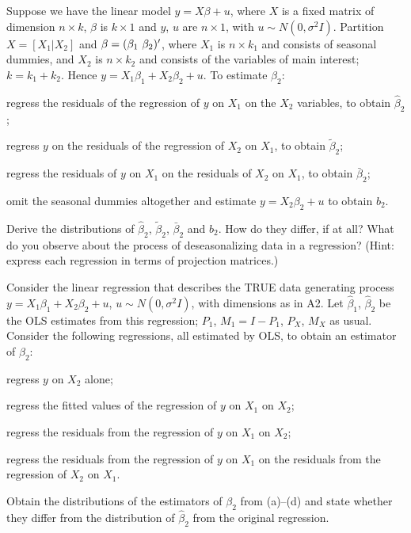 \documentclass[11pt]{article}
\begin{document}
Suppose we have the linear model $y = X\beta + u$, where $X$ is a fixed matrix of
dimension $n \times k$, $\beta$ is $k \times 1$ and $y$, $u$ are $n \times 1$,
with $u \sim N(0,\sigma^{2}I)$. Partition $X = [X_{1}|X_{2}]$ and
$\beta = (\beta_{1}\ \beta_{2})\xT$, where $X_{1}$ is $n \times k_{1}$ and
consists of seasonal dummies, and $X_{2}$ is $n \times k_{2}$ and consists of
the variables of main interest; $k = k_{1} + k_{2}$. Hence
$y = X_{1}\beta_{1} + X_{2}\beta_{2} + u$. To estimate $\beta_{2}$:
\begin{flatlist}
  \item[(i)] regress the residuals of the regression of $y$ on $X_{1}$ on the
        $X_{2}$ variables, to obtain $\hat\beta_{2}$;
  \item[(ii)] regress $y$ on the residuals of the regression of $X_{2}$ on
        $X_{1}$, to obtain $\tilde\beta_{2}$;
  \item[(iii)] regress the residuals of $y$ on $X_{1}$ on the residuals of $X_{2}$
        on $X_{1}$, to obtain $\bar\beta_{2}$;
  \item[(iv)] omit the seasonal dummies altogether and estimate
        $y = X_{2}\beta_{2} + u$ to obtain $b_{2}$.
\end{flatlist}
Derive the distributions of $\hat\beta_{2}$, $\tilde\beta_{2}$, $\bar\beta_{2}$
and $b_{2}$. How do they differ, if at all? What do you observe about the
process of deseasonalizing data in a regression? (Hint: express each regression
in terms of projection matrices.)

Consider the linear regression that describes the TRUE data generating process
$y = X_{1}\beta_{1} + X_{2}\beta_{2} + u$, $u \sim N(0,\sigma^{2}I)$, with
dimensions as in A2. Let $\hat\beta_{1}$, $\hat\beta_{2}$ be the OLS estimates
from this regression; $P_{1}$, $M_{1} = I - P_{1}$, $P_{X}$, $M_{X}$ as usual.
Consider the following regressions, all estimated by OLS, to obtain an estimator
of $\beta_{2}$:
\begin{flatlist}
  \item[(a)] regress $y$ on $X_{2}$ alone;
  \item[(b)] regress the fitted values of the regression of $y$ on $X_{1}$ on $X_{2}$;
  \item[(c)] regress the residuals from the regression of $y$ on $X_{1}$ on $X_{2}$;
  \item[(d)] regress the residuals from the regression of $y$ on $X_{1}$ on the
        residuals from the regression of $X_{2}$ on $X_{1}$.
\end{flatlist}
Obtain the distributions of the estimators of $\beta_{2}$ from (a)--(d) and state
whether they differ from the distribution of $\hat\beta_{2}$ from the original
regression.
\end{document}
